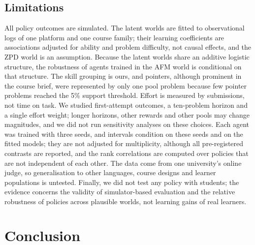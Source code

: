 \documentclass[a4paper,preprint,12pt,authoryear]{elsarticle}
\begin{document}
\subsection{Limitations}

All policy outcomes are simulated. The latent worlds are fitted to observational logs of one platform and one course family; their learning coefficients are associations adjusted for ability and problem difficulty, not causal effects, and the ZPD world is an assumption. Because the latent worlds share an additive logistic structure, the robustness of agents trained in the AFM world is conditional on that structure. The skill grouping is ours, and pointers, although prominent in the course brief, were represented by only one pool problem because few pointer problems reached the 5\% support threshold. Effort is measured by submissions, not time on task. We studied first-attempt outcomes, a ten-problem horizon and a single effort weight; longer horizons, other rewards and other pools may change magnitudes, and we did not run sensitivity analyses on these choices. Each agent was trained with three seeds, and intervals condition on these seeds and on the fitted models; they are not adjusted for multiplicity, although all pre-registered contrasts are reported, and the rank correlations are computed over policies that are not independent of each other. The data come from one university's online judge, so generalisation to other languages, course designs and learner populations is untested. Finally, we did not test any policy with students; the evidence concerns the validity of simulator-based evaluation and the relative robustness of policies across plausible worlds, not learning gains of real learners.

\section{Conclusion}\label{sec:conclusion}
\end{document}
